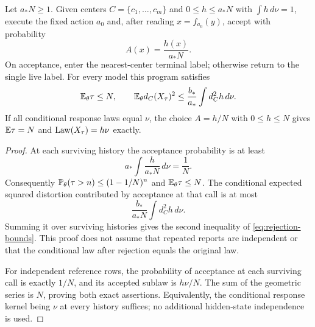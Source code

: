 \begin{lemma}\label{lem:rejection}
Let $a_*N\ge1$. Given centers $C=\{c_1,\ldots,c_m\}$ and $0\le h\le a_*N$ with $\int h\,d\nu=1$, execute the fixed action $a_0$ and, after reading $x=f_{a_0}(y)$, accept with probability
\begin{equation}\label{eq:accept}
 A(x)=\frac{h(x)}{a_*N}.
\end{equation}
On acceptance, enter the nearest-center terminal label; otherwise return to the single live label. For every model this program satisfies
\begin{equation}\label{eq:rejection-bounds}
 \mathbb E_\theta\tau\le N,\qquad
 \mathbb E_\theta d_C(X_\tau)^2
       \le\frac{b_*}{a_*}\int d_C^2h\,d\nu.
\end{equation}
If all conditional response laws equal $\nu$, the choice $A=h/N$ with $0\le h\le N$ gives $\mathbb E\tau=N$ and $\operatorname{Law}(X_\tau)=h\nu$ exactly.
\end{lemma}
\begin{proof}
At each surviving history the acceptance probability is at least
\[
 a_*\int\frac{h}{a_*N}\,d\nu=\frac1N.
\]
Consequently $\mathbb P_\theta(\tau>n)\le(1-1/N)^n$ and $\mathbb E_\theta\tau\le N$. The conditional expected squared distortion contributed by acceptance at that call is at most
\[
 \frac{b_*}{a_*N}\int d_C^2h\,d\nu.
\]
Summing it over surviving histories gives the second inequality of \eqref{eq:rejection-bounds}. This proof does not assume that repeated reports are independent or that the conditional law after rejection equals the original law.

For independent reference rows, the probability of acceptance at each surviving call is exactly $1/N$, and its accepted sublaw is $h\nu/N$. The sum of the geometric series is $N$, proving both exact assertions. Equivalently, the conditional response kernel being $\nu$ at every history suffices; no additional hidden-state independence is used.
\end{proof}

